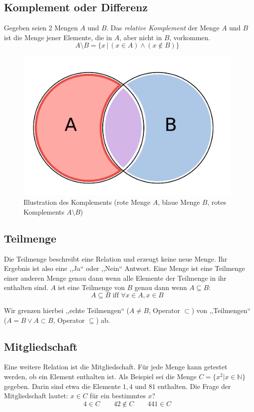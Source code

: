 \subsection{Komplement oder Differenz}
%
Gegeben seien 2 Mengen $A$ und $B$. Das \emph{relative Komplement} der Menge $A$ und $B$
ist die Menge jener Elemente, die in $A$, aber nicht in $B$, vorkommen.
\[
    A \setminus B = \{x \,|\, (x \in A) \land (x \notin B)\}
\]
%
\begin{figure}[p]
 \begin{center}
  \includegraphics{img/complement.pdf}
  \caption{Illustration des Komplements (rote Menge $A$, blaue Menge $B$,
        rotes Komplements $A \setminus B$)}
  \label{fig:complement}
 \end{center}
\end{figure}

\subsection{Teilmenge}
%
Die Teilmenge beschreibt eine Relation und erzeugt keine neue Menge.
Ihr Ergebnis ist also eine ,,Ja`` oder ,,Nein`` Antwort.
Eine Menge ist eine Teilmenge einer anderen Menge genau dann wenn alle
Elemente der Teilmenge in ihr enthalten sind. $A$ ist eine
Teilmenge von $B$ genau dann wenn $A \subseteq B$:
\[
    A \subseteq B \text{ iff } \forall x \in A, x \in B
\]

Wir grenzen hierbei ,,echte Teilmengen`` ($A \neq B $, Operator $\subset$)
von ,,Teilmengen`` ($A = B \lor A \subset B$, Operator $\subseteq$) ab.

\subsection{Mitgliedschaft}
%
Eine weitere Relation ist die Mitgliedschaft.
Für jede Menge kann getestet werden, ob ein Element enthalten ist. Als Beispiel
sei die Menge $C = \{x^2 | x \in \mathbb{N}\}$ gegeben. Darin sind etwa die Elemente
$1, 4$ und $81$ enthalten. Die Frage der Mitgliedschaft lautet: $x \in C$ für
ein bestimmtes $x$?
\[
  4 \in C  \qquad  42 \notin C  \qquad  441 \in C
\]


